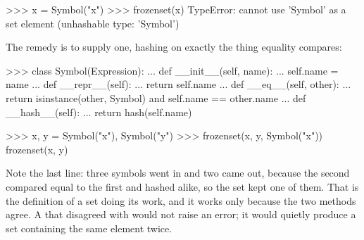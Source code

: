 \begin{revealTheSurface}
\begin{codeBlock}
>>> x = Symbol("x")
>>> frozenset({x})
TypeError: cannot use 'Symbol' as a set element
           (unhashable type: 'Symbol')
\end{codeBlock}

\noindent
The remedy is to supply one, hashing on exactly the thing equality compares:

\begin{codeBlock}
>>> class Symbol(Expression):
...     def __init__(self, name):
...         self.name = name
...     def __repr__(self):
...         return self.name
...     def __eq__(self, other):
...         return isinstance(other, Symbol) and self.name == other.name
...     def __hash__(self):
...         return hash(self.name)

>>> x, y = Symbol("x"), Symbol("y")
>>> frozenset({x, y, Symbol("x")})
frozenset({x, y})
\end{codeBlock}

\noindent
Note the last line: three symbols went in and two came out, because the second
 compared equal to the first and hashed alike, so the set kept one of
them.  That is the definition of a set doing its work, and it works only
because the two methods agree.  A  that disagreed with
 would not raise an error; it would quietly produce a set
containing the same element twice.
\end{revealTheSurface}
